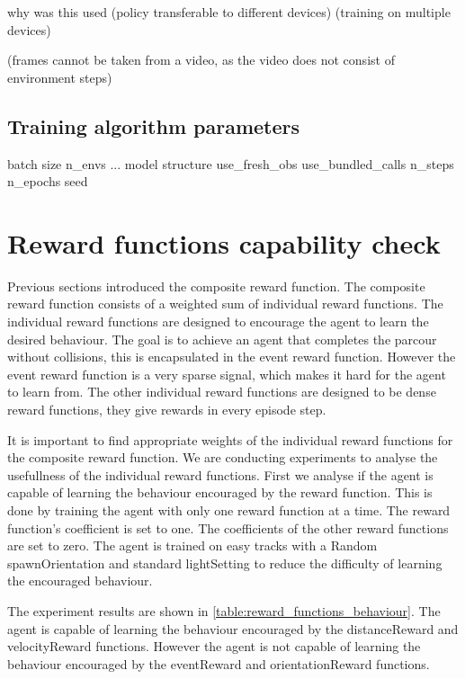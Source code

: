 why was this used (policy transferable to different devices) (training on multiple devices)

(frames cannot be taken from a video, as the video does not consist of environment steps)

\subsection{Training algorithm parameters}

batch size
n\_envs
...
model structure
use\_fresh\_obs
use\_bundled\_calls
n\_steps
n\_epochs
seed

\section{Reward functions capability check}

Previous sections introduced the composite reward function. The composite reward function consists of a weighted sum of individual reward functions. The individual reward functions are designed to encourage the agent to learn the desired behaviour. The goal is to achieve an agent that completes the parcour without collisions, this is encapsulated in the event reward function. However the event reward function is a very sparse signal, which makes it hard for the agent to learn from. The other individual reward functions are designed to be dense reward functions, they give rewards in every episode step.

It is important to find appropriate weights of the individual reward functions for the composite reward function. We are conducting experiments to analyse the usefullness of the individual reward functions. First we analyse if the agent is capable of learning the behaviour encouraged by the reward function.
This is done by training the agent with only one reward function at a time. The reward function's coefficient is set to one. The coefficients of the other reward functions are set to zero. The agent is trained on easy tracks with a Random spawnOrientation and standard lightSetting to reduce the difficulty of learning the encouraged behaviour.


The experiment results are shown in \ref{table:reward_functions_behaviour}. The agent is capable of learning the behaviour encouraged by the distanceReward and velocityReward functions. However the agent is not capable of learning the behaviour encouraged by the eventReward and orientationReward functions.


